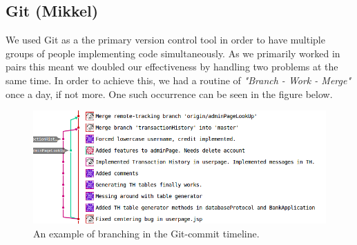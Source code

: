 \subsection{Git (Mikkel)}
We used Git as a the primary version control tool in order to have multiple groups of people implementing code simultaneously. As we primarily worked in pairs this meant we doubled our effectiveness by handling two problems at the same time. In order to achieve this, we had a routine of \textit{"Branch - Work - Merge"} once a day, if not more. One such occurrence can be seen in the figure below.

\begin{figure}[H]
    \centering
    \includegraphics[width=\linewidth]{figures/git.png}
    \caption{An example of branching in the Git-commit timeline.}
    \label{fig:git}
\end{figure}


